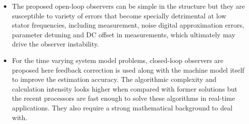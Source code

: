 \begin{itemize}
\item{The proposed open-loop observers can be simple in the structure but they are susceptible to variety of errors that become specially detrimental at low stator frequencies, including measurement, noise digital approximation errors, parameter detuning and DC offset in measurements, which ultimately may drive the observer instability.}\\
\item{For the time varying system model problems, closed-loop observers are proposed here feedback correction is used along with the machine model itself to improve the estimation accuracy. The algorithmic complexity and calculation intensity looks higher when compared with former solutions but the recent processors are fast enough to solve these algorithms in real-time applications. They also require a strong mathematical background to deal with.}
\end{itemize}
